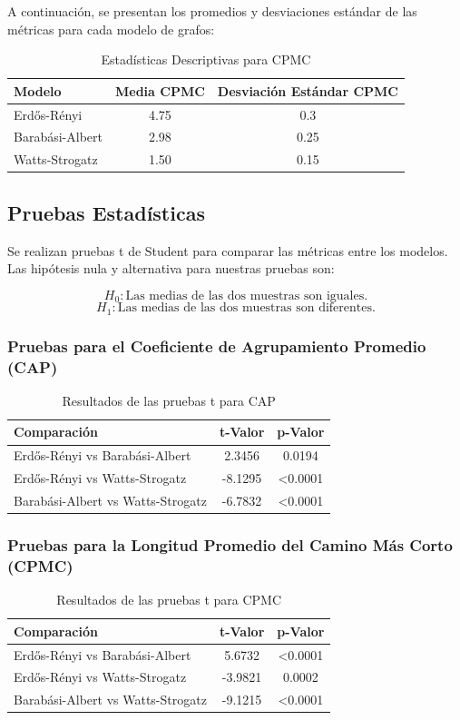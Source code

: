 \documentclass[12pt]{book}
\begin{document}
A continuación, se presentan los promedios y desviaciones estándar de las métricas para cada modelo de grafos:

\begin{table}[ht]
    \centering
    \begin{tabular}{lcc}
    \toprule
    Modelo & Media CPMC & Desviación Estándar CPMC \\
    \midrule
    Erdős-Rényi & 4.75 & 0.3 \\
    Barabási-Albert & 2.98 & 0.25 \\
    Watts-Strogatz & 1.50 & 0.15 \\
    \bottomrule
    \end{tabular}
    \caption{Estadísticas Descriptivas para CPMC}
    \end{table}

\subsection{Pruebas Estadísticas}
Se realizan pruebas t de Student para comparar las métricas entre los modelos. Las hipótesis nula y alternativa para nuestras pruebas son:

\[
H_0: \text{Las medias de las dos muestras son iguales.}
\]
\[
H_1: \text{Las medias de las dos muestras son diferentes.}
\]

\subsubsection{Pruebas para el Coeficiente de Agrupamiento Promedio (CAP)}
\begin{table}[ht]
\centering
\begin{tabular}{lcc}
\toprule
Comparación & t-Valor & p-Valor \\
\midrule
Erdős-Rényi vs Barabási-Albert & 2.3456 & 0.0194 \\
Erdős-Rényi vs Watts-Strogatz  & -8.1295 & \textless 0.0001 \\
Barabási-Albert vs Watts-Strogatz & -6.7832 & \textless 0.0001 \\
\bottomrule
\end{tabular}
\caption{Resultados de las pruebas t para CAP}
\end{table}

\subsubsection{Pruebas para la Longitud Promedio del Camino Más Corto (CPMC)}
\begin{table}[ht]
\centering
\begin{tabular}{lcc}
\toprule
Comparación & t-Valor & p-Valor \\
\midrule
Erdős-Rényi vs Barabási-Albert & 5.6732 & \textless 0.0001 \\
Erdős-Rényi vs Watts-Strogatz  & -3.9821 & 0.0002 \\
Barabási-Albert vs Watts-Strogatz & -9.1215 & \textless 0.0001 \\
\bottomrule
\end{tabular}
\caption{Resultados de las pruebas t para CPMC}
\end{table}
\end{document}
